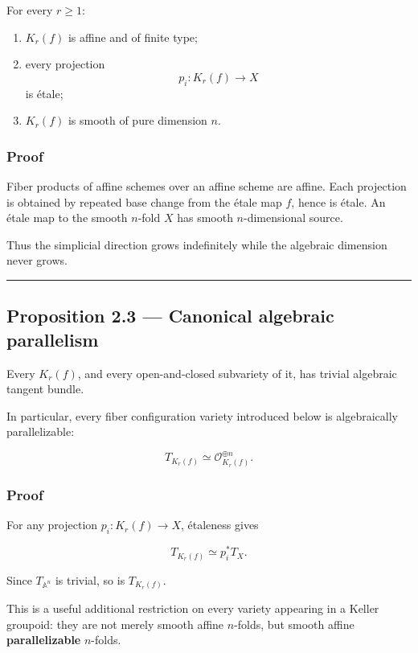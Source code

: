 For every \(r\ge1\):

\begin{enumerate}
\def\labelenumi{\arabic{enumi}.}
\tightlist
\item
  \(K_r(f)\) is affine and of finite type;
\item
  every projection \[
  p_i\colon K_r(f)\to X
  \] is étale;
\item
  \(K_r(f)\) is smooth of pure dimension \(n\).
\end{enumerate}

\subsubsection{Proof}\label{proof-1}

Fiber products of affine schemes over an affine scheme are affine. Each
projection is obtained by repeated base change from the étale map \(f\),
hence is étale. An étale map to the smooth \(n\)-fold \(X\) has smooth
\(n\)-dimensional source.

Thus the simplicial direction grows indefinitely while the algebraic
dimension never grows.

\begin{center}\rule{0.5\linewidth}{0.5pt}\end{center}

\subsection{Proposition 2.3 --- Canonical algebraic
parallelism}\label{proposition-2.3-canonical-algebraic-parallelism}

Every \(K_r(f)\), and every open-and-closed subvariety of it, has
trivial algebraic tangent bundle.

In particular, every fiber configuration variety introduced below is
algebraically parallelizable:

\[
T_{K_r(f)}\simeq\mathcal O_{K_r(f)}^{\oplus n}.
\]

\subsubsection{Proof}\label{proof-2}

For any projection \(p_i\colon K_r(f)\to X\), étaleness gives

\[
T_{K_r(f)}\simeq p_i^*T_X.
\]

Since \(T_{\mathbb A^n}\) is trivial, so is \(T_{K_r(f)}\).

This is a useful additional restriction on every variety appearing in a
Keller groupoid: they are not merely smooth affine \(n\)-folds, but
smooth affine \textbf{parallelizable} \(n\)-folds.

